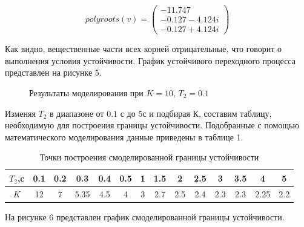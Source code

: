 \documentclass[a4paper, 11pt]{article}
\begin{document}
\begin{equation}
polyroots(v)=\left(
\begin{matrix}
-11.747 \\
-0.127-4.124i \\
-0.127+4.124i 
\end{matrix}
\right)
\end{equation}

\par 
Как видно, вещественные части всех корней отрицательные, что говорит о выполнения условия устойчивости. График устойчивого переходного процесса представлен на рисунке 5. 

\begin{figure}[h!]
\centering
{}
\caption{Результаты моделирования при $K=10$, $T_2=0.1$}
\end{figure}

\par 
Изменяя $T_2$ в диапазоне от $0.1$ с до $5 с$ и подбирая $К$, составим таблицу, необходимую  для построения границы устойчивости. Подобранные с помощью математического моделирования данные приведены в таблице 1.

\newpage
\begin{table}
\centering
\begin{threeparttable}
\caption{Точки построения смоделированной границы устойчивости}\label{tab:perflogcross}
\begin{tabular}{|c|c|c|c|c|c|c|c|c|c|c|c|c|c|}
\hline
$T_2$,c & 0.1 & 0.2 & 0.3 & 0.4 & 0.5 & 1 & 1.5 & 2 & 2.5 & 3 & 3.5 & 4 & 5 \\
\hline
$K$ & 12 & 7 & 5.35 & 4.5 & 4 & 3 & 2.7 & 2.5 & 2.4 & 2.3 & 2.3 & 2.25 & 2.2\\
\hline
\end{tabular}
\end{threeparttable}
\end{table}

\par 
На рисунке 6 представлен график смоделированной границы устойчивости.
\end{document}
